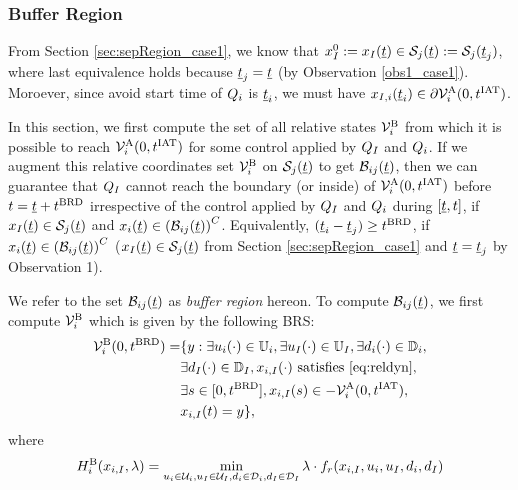 \subsubsection{Buffer Region} \label{sec:buffRegion_case1}
From Section \ref{sec:sepRegion_case1}, we know that $x_{I}^0 := x_{I}(\underline{t}) \in \mathcal{S}_j(\underline{t}) := \mathcal{S}_j(\underline{t}_j)$, where last equivalence holds because $\underline{t}_j = \underline{t}$ (by Observation \ref{obs1_case1}). Moroever, since avoid start time of $Q_i$ is $\underline{t}_i$, we must have $x_{I, i}(\underline{t}_i) \in \partial \mathcal{V}^{\text{A}}_{i}(0, t^\text{IAT})$.

In this section, we first compute the set of all relative states $\mathcal{V}^{\text{B}}_{i}$ from which it is possible to reach $\mathcal{V}^{\text{A}}_{i}(0, t^\text{IAT})$ for some control applied by $Q_{I}$ and $Q_i$. If we augment this relative coordinates set $\mathcal{V}^{\text{B}}_{i}$ on $\mathcal{S}_j(\underline{t})$ to get $\mathcal{B}_{ij}(\underline{t})$, then we can guarantee that $Q_{I}$ cannot reach the boundary (or inside) of $\mathcal{V}^{\text{A}}_{i}(0, t^\text{IAT})$ before $t = \underline{t} + t^\text{BRD}$ irrespective of the control applied by $Q_{I}$ and $Q_i$ during $[\underline{t}, t]$, if $x_{I}(\underline{t}) \in \mathcal{S}_j(\underline{t})$ and $x_i(\underline{t}) \in \left(\mathcal{B}_{ij}(\underline{t})\right)^C$. Equivalently, $(\underline{t}_i - \underline{t}_j) \geq t^\text{BRD}$, if $x_i(\underline{t}) \in \left(\mathcal{B}_{ij}(\underline{t})\right)^C$ ($x_{I}(\underline{t}) \in \mathcal{S}_j(\underline{t})$ from Section \ref{sec:sepRegion_case1} and $\underline{t} = \underline{t}_j$ by Observation 1).

We refer to the set $\mathcal{B}_{ij}(\underline{t})$ as \textit{buffer region} hereon. To compute $\mathcal{B}_{ij}(\underline{t})$, we first compute $\mathcal{V}^{\text{B}}_{i}$ which is given by the following BRS:
\begin{equation} \label{eqn:buffBRS_case1}
\begin{aligned}
\brs^{\text{B}}_{i}(0, \brd) = & \{y: \exists \ctrl_i(\cdot) \in \cfset_i, \exists \ctrl_\intr(\cdot) \in \cfset_\intr, \exists \dstb_i(\cdot) \in \dfset_i, \\
& \exists \dstb_\intr(\cdot) \in \dfset_\intr, \state_{i, \intr}(\cdot) \text{ satisfies \eqref{eq:reldyn}},\\
& \exists s \in [0, \brd], \state_{i, \intr}(s) \in -\brs^{\text{A}}_{i}(0, \iat),\\
& \state_{i, \intr}(t) = y\},
\end{aligned}
\end{equation}
where 
\begin{equation}
H^{\text{B}}_{i}(x_{i, I}, \lambda) = \min_{u_i \in \mathcal{U}_i, u_I \in \mathcal{U}_I, d_i \in \mathcal{D}_i, d_I \in \mathcal{D}_I} \lambda \cdot f_r(x_{i, I}, u_i, u_I, d_i, d_I)
\end{equation}

